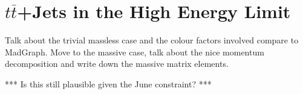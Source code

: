 \chapter{$t\overline t$+Jets in the High Energy Limit}
\label{chap:ttbar}

Talk about the trivial massless case and the colour factors involved compare to MadGraph.  Move to the massive case, talk about the nice momentum decomposition and write down the massive matrix elements.


*** Is this still plausible given the June constraint? ***

